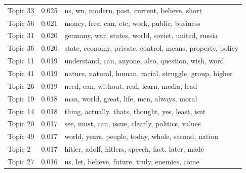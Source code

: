 \documentclass[12pt]{paper}
\begin{document}
\begin{table}[H]
\begin{adjustbox}{width=1\textwidth}
\begin{tabular}{lll}
	Topic 33                           & 0.025                                                  & ns, wn, modern, past, current, believe, short                       \\
	Topic 56                           & 0.021                                                  & money, free, can, etc, work, public, business                       \\
	Topic 31                           & 0.020                                                  & germany, war, states, world, soviet, united, russia                 \\
	Topic 36                           & 0.020                                                  & state, economy, private, control, means, property, policy           \\
	Topic 11                           & 0.019                                                  & understand, can, anyone, also, question, wish, word                 \\
	Topic 41                           & 0.019                                                  & nature, natural, human, racial, struggle, group, higher             \\
	Topic 26                           & 0.019                                                  & need, can, without, real, learn, media, lead                        \\
	Topic 19                           & 0.018                                                  & man, world, great, life, men, always, moral                         \\
	Topic 14                           & 0.018                                                  & thing, actually, thats, thought, yes, least, isnt                   \\
	Topic 20                           & 0.017                                                  & see, must, can, issue, clearly, politics, values                    \\
	Topic 49                           & 0.017                                                  & world, years, people, today, whole, second, nation                  \\
	Topic 2                            & 0.017                                                  & hitler, adolf, hitlers, speech, fact, later, made                   \\
	Topic 27                           & 0.016                                                  & us, let, believe, future, truly, enemies, come                      \\

\end{tabular}
\end{adjustbox}
\end{table}
\end{document}
